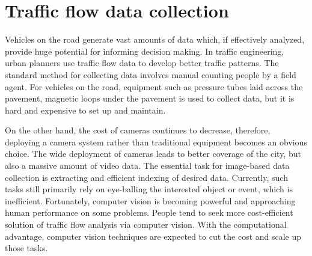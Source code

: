 \section{Traffic flow data collection}
\label{sec:intro-its}

Vehicles on the road generate vast amounts of data which, if effectively analyzed, provide huge potential for informing decision making.
In traffic engineering, urban planners use traffic flow data to develop better traffic patterns.
The standard method for collecting data involves manual counting people by a field agent.
For vehicles on the road, equipment such as pressure tubes laid across the pavement, magnetic loops under the pavement \cite{klein2006traffic,mimbela2000summary} is used to collect data, but it is hard and expensive to set up and maintain.

On the other hand, the cost of cameras continues to decrease, therefore, deploying a camera system rather than traditional equipment becomes an obvious choice.
The wide deployment of cameras leads to better coverage of the city, but also a massive amount of video data.
The essential task for image-based data collection is extracting and efficient indexing of desired data.
Currently, such tasks still primarily rely on eye-balling the interested object or event, which is inefficient.
Fortunately, computer vision is becoming powerful and approaching human performance on some problems.
People tend to seek more cost-efficient solution of traffic flow analysis via computer vision.
With the computational advantage, computer vision techniques are expected to cut the cost and scale up those tasks.